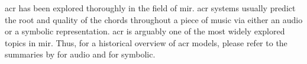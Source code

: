 

\gls{acr} has been explored thoroughly in the field of
\gls{mir}. \gls{acr} systems usually predict the root and
quality of the chords throughout a piece of music via either
an audio or a symbolic representation. \gls{acr} is arguably
one of the most widely explored topics in \gls{mir}. Thus,
for a historical overview of \gls{acr} models, please refer
to the summaries by \textcite{pauwels201920} for audio and
\textcite[p. 58--88]{ju2021addressing} for symbolic.
